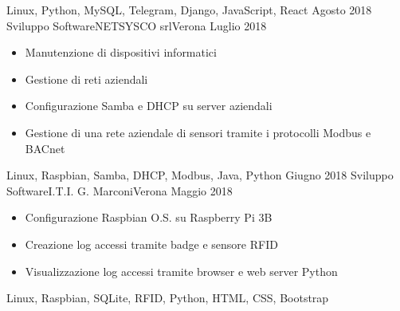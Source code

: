 \begin{experiences}
{\begin{itemize}
                      \end{itemize}
                    }
                    {Linux, Python, MySQL, Telegram, Django, JavaScript, React}
  \emptySeparator
  \experience
    {Agosto 2018} {Sviluppo Software}{NETSYSCO srl}{Verona}
    {Luglio 2018}    {
		  \smallskip
                      \begin{itemize}
                        \item Manutenzione di dispositivi informatici
                        \item Gestione di reti aziendali
                        \item Configurazione Samba e DHCP su server aziendali
                        \item Gestione di una rete aziendale di sensori tramite i protocolli Modbus e BACnet
                      \end{itemize}
                    }
                    {Linux, Raspbian, Samba, DHCP, Modbus, Java, Python}
  \emptySeparator
  \experience
    {Giugno 2018}   {Sviluppo Software}{I.T.I. G. Marconi}{Verona}
    {Maggio 2018} {
                      \begin{itemize}
                        \item Configurazione Raspbian O.S. su Raspberry Pi 3B
                        \item Creazione log accessi tramite badge e sensore RFID
                        \item Visualizzazione log accessi tramite browser e web server Python
                      \end{itemize}
                    }
                    {Linux, Raspbian, SQLite, RFID, Python, HTML, CSS, Bootstrap}
\end{experiences}
